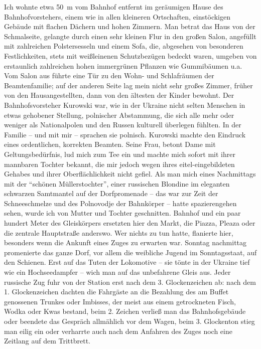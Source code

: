 \documentclass[a5paper,pagesize,10pt,twoside=true]{scrbook}
\begin{document}
Ich wohnte etwa 50~m vom Bahnhof entfernt im geräumigen Hause des Bahnhofvorstehers, einem wie in allen kleineren Ortschaften, einstöckigen Gebäude mit flachen Dächern und hohen Zimmern. Man betrat das Haus von der Schmalseite, gelangte durch einen sehr kleinen Flur in den großen Salon, angefüllt mit zahlreichen Polstersesseln und einem Sofa, die, abgesehen von besonderen Festlichkeiten, stets mit weißleinenen Schutzbezügen bedeckt waren, umgeben von erstaunlich zahlreichen hohen immergrünen Pflanzen wie Gummibäumen u.a. Vom Salon aus führte eine Tür zu den Wohn- und Schlafräumen der Beamtenfamilie; auf der anderen Seite lag mein nicht sehr großes Zimmer, früher von den Hausangestellten, dann von den ältesten der Kinder bewohnt. Der Bahnhofsvorsteher Kurowski war, wie in der Ukraine nicht selten Menschen in etwas gehobener Stellung, polnischer Abstammung, die sich alle mehr oder weniger als Nationalpolen und den Russen kulturell überlegen fühlten. In der Familie -- und mit mir -- sprachen sie polnisch. Kurowski machte den Eindruck eines ordentlichen, korrekten Beamten. Seine Frau, betont Dame mit Geltungsbedürfnis, lud mich zum Tee ein und machte mich sofort mit ihrer mannbaren Tochter bekannt, die mir jedoch wegen ihres eitel-eingebildeten Gehabes und ihrer Oberflächlichkeit nicht gefiel. Als man mich eines Nachmittags mit der \enquote{schönen Müllerstochter}, einer russischen Blondine im eleganten schwarzen Samtmantel auf der Dorfpromenade -- das war zur Zeit der Schneeschmelze und des Polnovodje der Bahnkörper -- hatte spazierengehen sehen, wurde ich von Mutter und Tochter geschnitten. Bahnhof und ein paar hundert Meter des Gleiskörpers ersetzten hier den Markt, die Piazza, Pleaza oder die zentrale Hauptstraße anderswo. Wer nichts zu tun hatte, flanierte hier, besonders wenn die Ankunft eines Zuges zu erwarten war. Sonntag nachmittag promenierte das ganze Dorf, vor allem die weibliche Jugend im Sonntagsstaat, auf den Schienen. Erst auf das Tuten der Lokomotive -- sie tönte in der Ukraine tief wie ein Hochseedampfer -- wich man auf das unbefahrene Gleis aus. Jeder russische Zug fuhr von der Station erst nach dem 3. Glockenzeichen ab: nach dem 1. Glockenzeichen dachten die Fahrgäste an die Bezahlung des am Buffet genossenen Trunkes oder Imbisses, der meist aus einem getrockneten Fisch, Wodka oder Kwas bestand, beim 2. Zeichen verließ man das Bahnhofsgebäude oder beendete das Gespräch allmählich vor dem Wagen, beim 3. Glockenton stieg man eilig ein oder verharrte auch nach dem Anfahren des Zuges noch eine Zeitlang auf dem Trittbrett.
\end{document}
